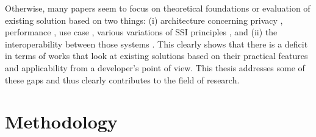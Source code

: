    Otherwise, many papers seem to focus on theoretical foundations or evaluation of existing solution based on two things: (i) architecture \cite{gruner_relevance_2018} concerning privacy \cite{bernabe_privacy-preserving_2019}, performance \cite{bouras_distributed_2020}, use case \cite{kuperberg_blockchain-based_2020}, various variations \cite{allen_path_2016, reed_decentralized_2021, allende_lopez_self-sovereign_2020, bouras_distributed_2020, ferdous_search_2019, cameron_laws_2005} of \ac{SSI} principles \cite{van_bokkem_self-sovereign_2019, bouras_distributed_2020, dib_decentralized_2020, dunphy_first_2018, ferdous_search_2019, friedewald_self-sovereign_2020}, and (ii) the interoperability between those systems \cite{homeland_security_preventing_2020, john_dhs_2020}. This clearly shows that there is a deficit in terms of works that look at existing solutions based on their practical features and applicability from a developer's point of view. This thesis addresses some of these gaps and thus clearly contributes to the field of research.
	
	\section{Methodology}

